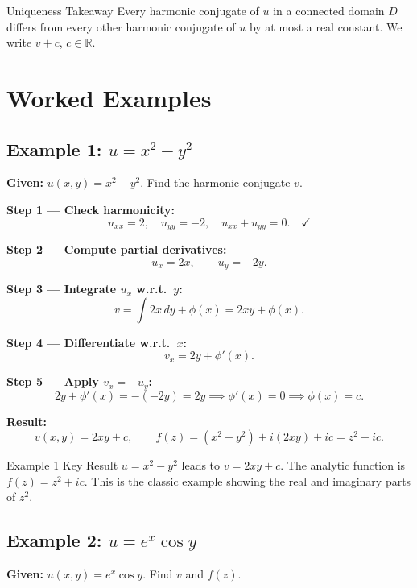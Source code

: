 \documentclass[12pt,a4paper]{article}
\begin{document}
\begin{learnbox}{Uniqueness Takeaway}
Every harmonic conjugate of $u$ in a connected domain $D$ differs from every other harmonic
conjugate of $u$ by at most a real constant. We write $v+c$, $c\in\mathbb{R}$.
\end{learnbox}

\section{Worked Examples}

\subsection*{Example 1: $u = x^2 - y^2$}

\textbf{Given:} $u(x,y)=x^2-y^2$. Find the harmonic conjugate $v$.

\medskip
\textbf{Step 1 --- Check harmonicity:}
\[
  u_{xx} = 2,\quad u_{yy}=-2,\quad u_{xx}+u_{yy}=0.\quad\checkmark
\]

\textbf{Step 2 --- Compute partial derivatives:}
\[
  u_x = 2x,\qquad u_y = -2y.
\]

\textbf{Step 3 --- Integrate $u_x$ w.r.t.\ $y$:}
\[
  v = \int 2x\,dy + \phi(x) = 2xy + \phi(x).
\]

\textbf{Step 4 --- Differentiate w.r.t.\ $x$:}
\[
  v_x = 2y + \phi'(x).
\]

\textbf{Step 5 --- Apply $v_x = -u_y$:}
\[
  2y+\phi'(x)=-(-2y)=2y \implies \phi'(x)=0 \implies \phi(x)=c.
\]

\textbf{Result:}
\[
  \boxed{v(x,y)=2xy+c,\qquad f(z)=(x^2-y^2)+i(2xy)+ic=z^2+ic.}
\]

\begin{learnbox}{Example 1 Key Result}
$u=x^2-y^2$ leads to $v=2xy+c$. The analytic function is $f(z)=z^2+ic$. This is the
classic example showing the real and imaginary parts of $z^2$.
\end{learnbox}

\subsection*{Example 2: $u = e^x\cos y$}

\textbf{Given:} $u(x,y)=e^x\cos y$. Find $v$ and $f(z)$.
\end{document}
